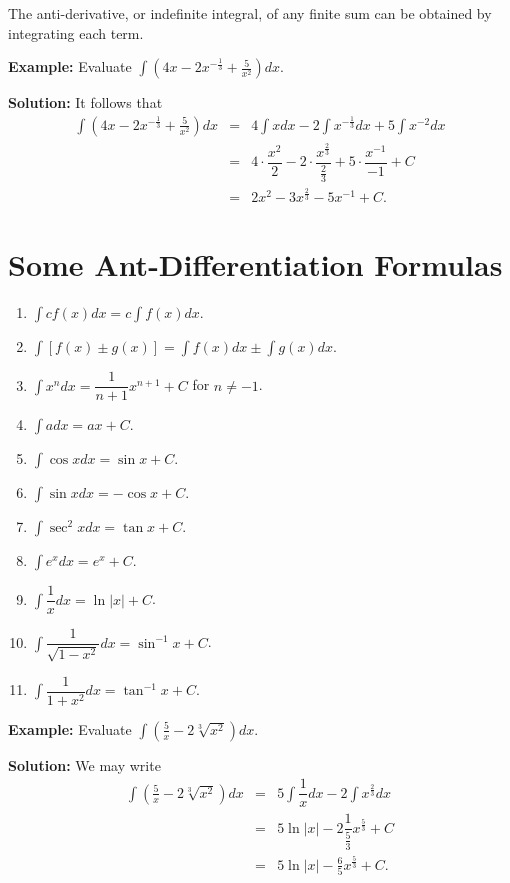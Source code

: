 \documentclass[titlepage,a4paper,12pt]{report}
\begin{document}
\noindent The anti-derivative, or indefinite integral, of any finite sum can be obtained by integrating each term.

\noindent \textbf{Example:} Evaluate $\displaystyle \int \left(4x-2x^{-\frac{1}{3}}+\frac{5}{x^2} \right)dx$.

\noindent \textbf{Solution:} It follows that 
\begin{eqnarray*}
\int \left(4x-2x^{-\frac{1}{3}}+\frac{5}{x^2} \right)dx &=& 4\int x dx-2\int x^{-\frac{1}{3}}dx +5\int x^{-2}dx\\
&=& 4\cdot \dfrac{x^2}{2}-2\cdot \dfrac{x^{\frac{2}{3}}}{\frac{2}{3}}+5\cdot \dfrac{x^{-1}}{-1}+C\\
&=&2x^2 -3x^{\frac{2}{3}}-5x^{-1} +C.
\end{eqnarray*}
\section{Some Ant-Differentiation Formulas}
\begin{enumerate}
\item $\displaystyle \int cf(x)dx=c\int f(x)dx $.
\item $\displaystyle \int [f(x)\pm g(x)]=\displaystyle \int f(x)dx \pm \displaystyle \int g(x)dx$.
\item $\displaystyle \int x^n dx =\dfrac{1}{n+1} x^{n+1} + C$ for $n\neq -1$.
\item $\displaystyle \int adx =ax +C $.
\item $\displaystyle \int \cos x dx =\sin x +C$.
\item $\displaystyle \int \sin x dx =-\cos x +C$.
\item $\displaystyle \int\sec ^2 x dx =\tan x +C$.
\item $\displaystyle \int e^x dx =e^x +C$.
\item $\displaystyle \int \dfrac{1}{x} dx =\ln |x| +C$.
\item $\displaystyle \int \dfrac{1}{\sqrt{1-x^2}}dx =\sin ^{-1} x +C$.
\item $\displaystyle \int \dfrac{1}{1+x^2}dx= \tan ^{-1} x +C$.
\end{enumerate}

\noindent \textbf{Example:} Evaluate $\displaystyle \int \left(\frac{5}{x}-2\sqrt[3]{x^2}\right)dx$.

\noindent \textbf{Solution:} We may write 
\begin{eqnarray*}
\int \left(\frac{5}{x}-2\sqrt[3]{x^2}\right)dx &=& 5\int \dfrac{1}{x} dx -2\int x^{\frac{2}{3}}dx\\
&=& 5\ln |x| -2\dfrac{1}{\frac{5}{3}}x^{\frac{5}{3}} +C\\
&=& 5\ln |x| -\frac{6}{5}x^{\frac{5}{3}} +C.
\end{eqnarray*}
\end{document}
